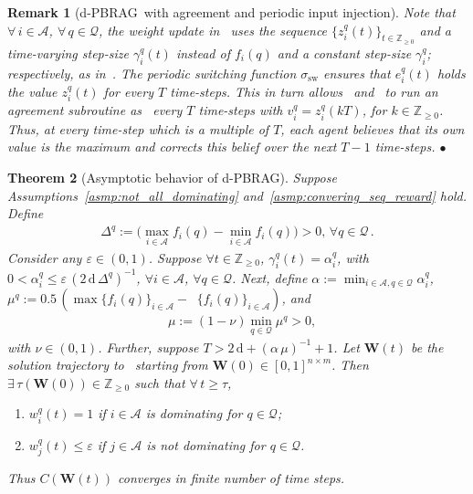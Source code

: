 \documentclass{IEEEtran}
\newcommand{\ldef}{:=}
\newcommand{\Mcal}[1]{\mathcal{#1}}
\newcommand{\Mc}[1]{\mathcal{#1}}
\newcommand{\bld}[1]{\mathbf{#1}}
\newtheorem{theorem}{Theorem}[section]
\newtheorem{remark}[theorem]{Remark}
\newcommand{\integer}{\ensuremath{\mathbb{Z}}}
\newcommand{\bulletsym}{\hbox{$\bullet$}}
\newcommand{\bulletend}{\relax\ifmmode\else\unskip\hfill\fi\bulletsym}
\newcommand{\marginn}[1]{\marginpar{\color{blue}\tiny\ttfamily#1}}
\newcommand{\margin}[1]{\marginpar{\color{magenta}\tiny\ttfamily#1}}
\def \agt{\Mcal{A}}
\def \dg{\mathrm{d}}
\def \fseq{z}
\def \integer{\mathbb{Z}}
\def \intpos{\integer_{\geq 0}}
\def \setfunc{C}
\def \switch{\sigma_\mathrm{sw}}
\def \tsk{\Mc{Q}}
\def \W{\bld{W}}
\DeclareMathOperator*{\submax}{max^{(2)}}
\def \dynacr{PBRAG}
\begin{document}
\begin{remark}[d-\dynacr\, with agreement and periodic input
  injection]\label{rem:dist_dyn} {\rm Note that
    $\forall \, i \in \agt$, $\forall \, q \in \tsk$, the weight
    update in~ uses the sequence
    $\{\fseq^q_i(t)\}_{t \in \intpos}$ and a time-varying step-size
    $\gamma^q_i(t)$ instead of $f_i(q)$ and a constant step-size
    $\gamma^q_i$; respectively, as
    in~. The periodic switching function
    $\switch$ ensures that $e^q_i(t)$ holds the value $\fseq^q_i(t)$
    for every $T$ time-steps. This in turn
    allows~ and~ to
    run an agreement subroutine as~
    every $T$ time-steps with $v^q_i = \fseq^q_i(kT)$, for
    $k \in \intpos$. Thus, at every time-step which is a multiple of
    $T$, each agent believes that its own value is the maximum and
    corrects this belief over the next $T-1$
    time-steps.} %
\bulletend
\end{remark}

\begin{theorem}[Asymptotic behavior of d-\dynacr] 
\label{th:dist_pbrag_asymp}
Suppose Assumptions~\ref{asmp:not_all_dominating} and~\ref{asmp:convering_seq_reward} hold.
Define
\begin{align}
  \Delta^q \ldef \Big(\max_{i \in \agt}
  f_i(q) - \min_{i \in \agt} f_i(q) \Big) > 0, \, \forall q \in \tsk\,.
	\label{eq:max_minus_min}
\end{align}
Consider any $\varepsilon \in (0,1)$. Suppose $\forall t \in \intpos$,
$\gamma^q_i(t) = \alpha^q_i$, with
$0 < \alpha^q_i \leq \varepsilon \, (2\,\dg \, \Delta^q)^{-1}$,
$\forall i \in \agt$, $\forall q \in \tsk$.  Next, define
$\alpha \ldef \min_{i \in \agt, q \in \tsk} \alpha^q_i$,
$\mu^q \ldef 0.5\,(\max \{f_i(q)\}_{i \in \agt} - \submax
\{f_i(q)\}_{i \in \agt})$, and
\begin{align}
	& \mu \ldef (1-\nu) \min_{q \in \tsk}\mu^q > 0,
	\label{eq:max_minus_submax} 	
\end{align}
with $\nu \in (0,1)$.  Further, suppose
$T > 2\,\dg + (\alpha\,\mu)^{-1} + 1$.  Let $\W(t)$ be the solution trajectory
to~ starting from $\W(0) \in [0,1]^{n \times
  m}$. Then $\exists \, \tau(\W(0)) \in \intpos$ such that
$\forall\, t \geq \tau$,
\begin{enumerate}
\item \label{prop:dist_pbrag_dom_agt} $w^q_i(t) = 1$ if $i \in \agt$
  is dominating for $q \in \tsk$;
\item \label{prop:dist_pbrag_not_dom_agt} $w^q_j(t) \leq \varepsilon$
  if $j \in \agt$ is not dominating for $q \in \tsk$.
\end{enumerate}
Thus $\setfunc(\W(t))$ converges in finite number of time steps.
\end{theorem}
\end{document}
